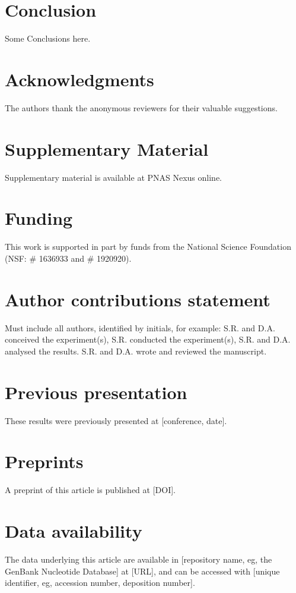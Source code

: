 \documentclass[unnumsec,webpdf,contemporary,large]{oup-authoring-template}%
\theoremstyle{thmstyleone}%
\theoremstyle{thmstyletwo}%
\theoremstyle{thmstylethree}%
\begin{document}
\section{Conclusion}

Some Conclusions here.



\section{Acknowledgments}
The authors thank the anonymous reviewers for their valuable suggestions. 

\section{Supplementary Material}
Supplementary material is available at PNAS Nexus online.

\section{Funding}
This work is supported in part by funds from the National Science Foundation (NSF: \# 1636933 and \# 1920920).

\section{Author contributions statement}
Must include all authors, identified by initials, for example:
S.R. and D.A. conceived the experiment(s),  S.R. conducted the experiment(s), S.R. and D.A. analysed the results.  S.R. and D.A. wrote and reviewed the manuscript.

\section{Previous presentation}
These results were previously presented at [conference, date].

\section{Preprints}
A preprint of this article is published at [DOI].

\section{Data availability}
The data underlying this article are available in [repository name, eg, the GenBank Nucleotide Database] at [URL], and can be accessed with [unique identifier, eg, accession number, deposition number].





\end{document}
